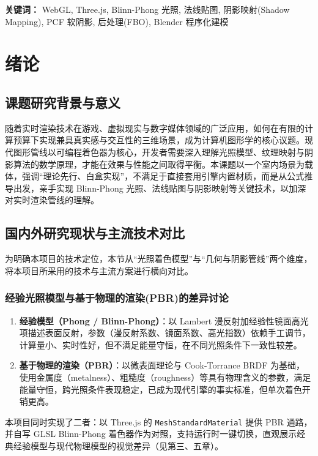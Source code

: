 \documentclass[11pt, a4paper, oneside]{report}
\newcommand{\code}[1]{\texttt{#1}}
\begin{document}
\textbf{关键词：} WebGL, Three.js, Blinn-Phong 光照, 法线贴图, 阴影映射(Shadow Mapping), PCF 软阴影, 后处理(FBO), Blender 程序化建模

\tableofcontents

\chapter{绪论}

\section{课题研究背景与意义}
随着实时渲染技术在游戏、虚拟现实与数字媒体领域的广泛应用，如何在有限的计算预算下实现兼具真实感与交互性的三维场景，成为计算机图形学的核心议题。现代图形管线以可编程着色器为核心，开发者需要深入理解光照模型、纹理映射与阴影算法的数学原理，才能在效果与性能之间取得平衡。本课题以一个室内场景为载体，强调“理论先行、白盒实现”，不满足于直接套用引擎内置材质，而是从公式推导出发，亲手实现 Blinn-Phong 光照、法线贴图与阴影映射等关键技术，以加深对实时渲染管线的理解。

\section{国内外研究现状与主流技术对比}
为明确本项目的技术定位，本节从“光照着色模型”与“几何与阴影管线”两个维度，将本项目所采用的技术与主流方案进行横向对比。

\subsection{经验光照模型与基于物理的渲染(PBR)的差异讨论}
\begin{enumerate}
    \item \textbf{经验模型（Phong / Blinn-Phong）}：以 Lambert 漫反射加经验性镜面高光项描述表面反射，参数（漫反射系数、镜面系数、高光指数）依赖手工调节，计算量小、实时性好，但不满足能量守恒，在不同光照条件下一致性较差。
    \item \textbf{基于物理的渲染（PBR）}：以微表面理论与 Cook-Torrance BRDF 为基础，使用金属度（metalness）、粗糙度（roughness）等具有物理含义的参数，满足能量守恒，跨光照条件表现稳定，已成为现代引擎的事实标准，但单次着色开销更高。
\end{enumerate}
本项目同时实现了二者：以 Three.js 的 \code{MeshStandardMaterial} 提供 PBR 通路，并自写 GLSL Blinn-Phong 着色器作为对照，支持运行时一键切换，直观展示经典经验模型与现代物理模型的视觉差异（见第三、五章）。
\end{document}

